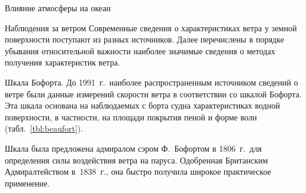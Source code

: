 \begin{chapter}{Влияние атмосферы на океан}
\begin{section}{Наблюдения за ветром}
Современные сведения о характеристиках ветра у земной поверхности
поступают из разных источников. Далее перечислены в порядке убывания
относительной важности наиболее значимые сведения о методах получения
характеристик ветра.
%


\begin{paragraph}{Шкала Бофорта.}
До 1991~г.\ наиболее распространенным источником сведений о ветре были данные
измерений скорости ветра в соответствии со шкалой Бофорта. Эта шкала основана
на наблюдаемых с борта судна характеристиках водной поверхности, в
частности, на площади покрытия пеной и форме волн (табл.~\ref{tbl:beaufort}).
%

Шкала была предложена адмиралом сэром Ф.~Бофортом в 1806~г.\ для
определения силы воздействия ветра на паруса. Одобренная Британским
Адмиралтейством в~1838~г., она быстро получила широкое практическое применение.
%


\end{paragraph}
\end{section}
\end{chapter}
